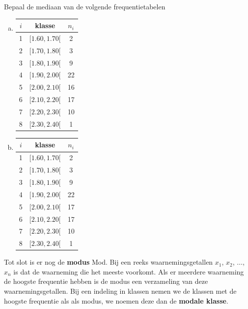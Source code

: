 \documentclass[12pt,twoside]{article}
\begin{document}
\begin{oefening}
Bepaal de mediaan van de volgende frequentietabelen
\begin{multicols}{2}
\begin{enumerate}[(a)]
  \item
  \begin{center}
\begin{tabular}{c|c|c}
$i$ & klasse     & $n_i$\\
\hline
  1 & $[ 1.60,  1.70[$ &   2\\
  2 & $[ 1.70,  1.80[$ &   3\\
  3 & $[ 1.80,  1.90[$ &   9\\
  4 & $[ 1.90,  2.00[$ &   22\\
  5 & $[ 2.00,  2.10[$ &   16\\
  6 & $[ 2.10,  2.20[$ &   17\\
  7 & $[ 2.20,  2.30[$ &   10\\
  8 & $[ 2.30,  2.40[$ &   1\\
\end{tabular}
\end{center}
  \item
  \begin{center}
\begin{tabular}{c|c|c}
$i$ & klasse     & $n_i$\\
\hline
  1 & $[ 1.60,  1.70[$ &   2\\
  2 & $[ 1.70,  1.80[$ &   3\\
  3 & $[ 1.80,  1.90[$ &   9\\
  4 & $[ 1.90,  2.00[$ &   22\\
  5 & $[ 2.00,  2.10[$ &   17\\
  6 & $[ 2.10,  2.20[$ &   17\\
  7 & $[ 2.20,  2.30[$ &   10\\
  8 & $[ 2.30,  2.40[$ &   1\\
\end{tabular}
\end{center}
\end{enumerate}
\end{multicols}
\end{oefening}

Tot slot is er nog de {\bf modus} Mod. Bij een reeks waarnemingsgetallen $x_1$, $x_2$, $\ldots$, $x_n$ is dat de waarneming die het meeste voorkomt. Als er meerdere waarneming de hoogste frequentie hebben is de modus een verzameling van deze waarnemingsgetallen. Bij een indeling in klassen nemen we de klassen met de hoogste frequentie als als modus, we noemen deze dan de {\bf modale klasse}.
\end{document}
